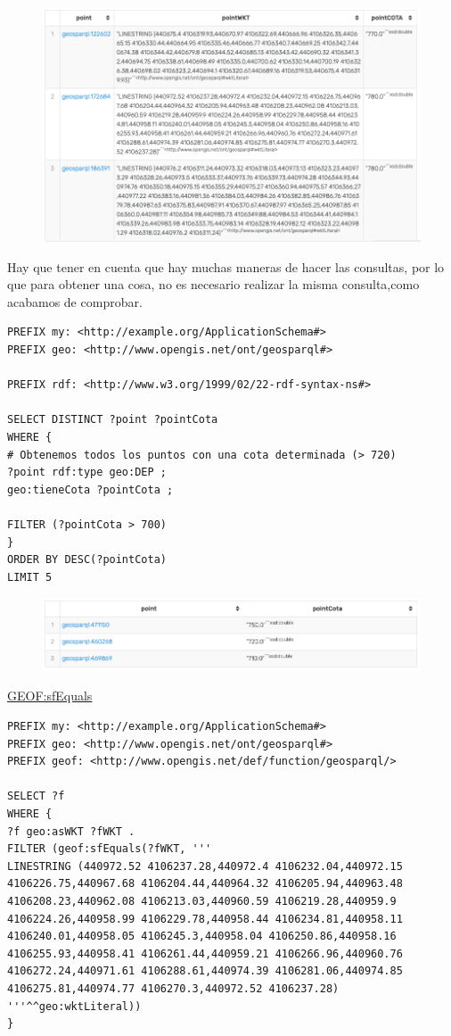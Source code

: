 \begin{figure}[H]
	\centering
	\includegraphics[width=0.7\linewidth]{imagenes/capitulo4/salida6}
	\caption{}
	\label{fig:salida6}
\end{figure}



Hay que tener en cuenta que hay muchas maneras de hacer las consultas, por lo que para obtener una cosa, no es necesario realizar la misma consulta,como acabamos de comprobar.

\begin{lstlisting}
PREFIX my: <http://example.org/ApplicationSchema#>
PREFIX geo: <http://www.opengis.net/ont/geosparql#>

PREFIX rdf: <http://www.w3.org/1999/02/22-rdf-syntax-ns#>

SELECT DISTINCT ?point ?pointCota
WHERE {
# Obtenemos todos los puntos con una cota determinada (> 720)
?point rdf:type geo:DEP ;
geo:tieneCota ?pointCota ;

FILTER (?pointCota > 700)
}
ORDER BY DESC(?pointCota)
LIMIT 5
\end{lstlisting}

\begin{figure}[H]
	\centering
	\includegraphics[width=0.7\linewidth]{imagenes/capitulo4/salida5}
	\caption{}
	\label{fig:salida5}
\end{figure}


\underline{GEOF:sfEquals}

\begin{lstlisting}
PREFIX my: <http://example.org/ApplicationSchema#>
PREFIX geo: <http://www.opengis.net/ont/geosparql#>
PREFIX geof: <http://www.opengis.net/def/function/geosparql/>

SELECT ?f
WHERE {
?f geo:asWKT ?fWKT .
FILTER (geof:sfEquals(?fWKT, '''
LINESTRING (440972.52 4106237.28,440972.4 4106232.04,440972.15 4106226.75,440967.68 4106204.44,440964.32 4106205.94,440963.48 4106208.23,440962.08 4106213.03,440960.59 4106219.28,440959.9 4106224.26,440958.99 4106229.78,440958.44 4106234.81,440958.11 4106240.01,440958.05 4106245.3,440958.04 4106250.86,440958.16 4106255.93,440958.41 4106261.44,440959.21 4106266.96,440960.76 4106272.24,440971.61 4106288.61,440974.39 4106281.06,440974.85 4106275.81,440974.77 4106270.3,440972.52 4106237.28)
'''^^geo:wktLiteral))
} 
\end{lstlisting}

